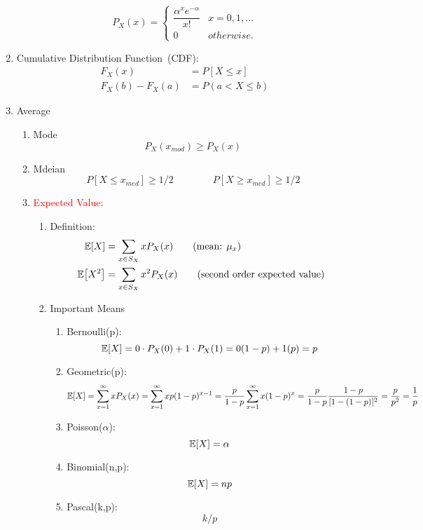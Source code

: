 \begin{enumerate}
{\begin{enumerate}
{                \[ P_X(x) = 
                \begin{cases}
                    \dfrac{\alpha^xe^{-\alpha}}{x!}   & x=0,1,\ldots \\
                    0   & otherwise.
                \end{cases} \]
            }
        \end{enumerate}
    }
    \item Cumulative Distribution Function~(CDF): {
        \begin{align*}
            F_X(x)&=P[X\leq x] \\
            F_X(b)-F_X(a)&=P(a<X\leq b)
        \end{align*}
    }
    \item Average{
        \begin{enumerate}
            \item Mode $$P_X(x_{mod})\geq P_X(x)$$
            \item Mdeian $$P[X\leq x_{med}]\geq 1/2 \qquad \qquad P[X\geq x_{med}]\geq 1/2$$
            \item \textcolor{red}{Expected Value:} {
                \begin{enumerate}
                    \item Definition:{
                        \begin{align}
                            \E{X}&=\sum_{x\in S_X}xP_X(x) \tag{mean: $\mu_x$}\\
                            \E{X^2}&=\sum_{x\in S_X}x^2P_X(x) \tag{second order expected value}
                        \end{align}
                    }
                    \item Important Means{
                        \begin{enumerate}
                            \item Bernoulli(p): $$\E{X}=0\cdot P_X(0)+1\cdot P_X(1)=0(1-p)+1(p)=p$$
                            \item Geometric(p): $$\E{X}=\sum_{x=1}^{\infty}xP_X(x)=\sum_{x=1}^{\infty}xp(1-p)^{x-1}=\dfrac{p}{1-p}\sum_{x=1}^{\infty}x(1-p)^x=\dfrac{p}{1-p}\dfrac{1-p}{[1-(1-p)]^2}=\dfrac{p}{p^2}=\dfrac{1}{p}$$
                            \item Poisson($\alpha$): $$\E{X}=\alpha$$
                            \item Binomial(n,p): $$\E{X}=np$$
                            \item Pascal(k,p): $$k/p$$

\end{enumerate}}
\end{enumerate}}
\end{enumerate}}
\end{enumerate}
